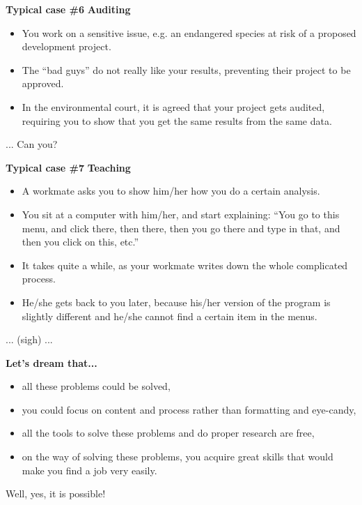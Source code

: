 \documentclass[9pt,xcolor=pdftex,dvipsnames,table]{beamer}
\begin{document}
\begin{frame}{\textbf{Typical case \#6}}
\textbf{Auditing}
\begin{itemize}
\item You work on a sensitive issue, e.g. an endangered species at
  risk of a proposed development project.
\item The ``bad guys'' do not really like your results, preventing
  their project to be approved.
\item In the environmental court, it is agreed that your project gets
  audited, requiring you to show that you get the same results from
  the same data.
\end{itemize}
\vspace{0.6cm}
... Can you?
\vspace{-0.5cm}
\end{frame}



\begin{frame}{\textbf{Typical case \#7}}
\textbf{Teaching}
\begin{itemize}
\item A workmate asks you to show him/her how you do a certain analysis.
\item You sit at a computer with him/her, and start explaining: 
``You go to this menu, and click there, then there, then you go there
and type in that, and then you click on this, etc.''
\item It takes quite a while, as your workmate writes down the whole
  complicated process.
\item He/she gets back to you later, because his/her version of the
  program is slightly different and he/she cannot find a certain item
  in the menus.
\end{itemize}
\vspace{0.6cm}
... (sigh) ...
\vspace{-0.5cm}
\end{frame}


\begin{frame}{\textbf{Let's dream that...}}
\begin{itemize}
\item all these problems could be solved,
\item you could focus on content and process rather than formatting
  and eye-candy,
\item all the tools to solve these problems and do proper research are free,
\item on the way of solving these problems, you acquire great skills
  that would make you find a job very easily.
\end{itemize}
\vspace{0.6cm}
Well, yes, it is possible!
\vspace{-0.5cm}
\end{frame}
\end{document}
